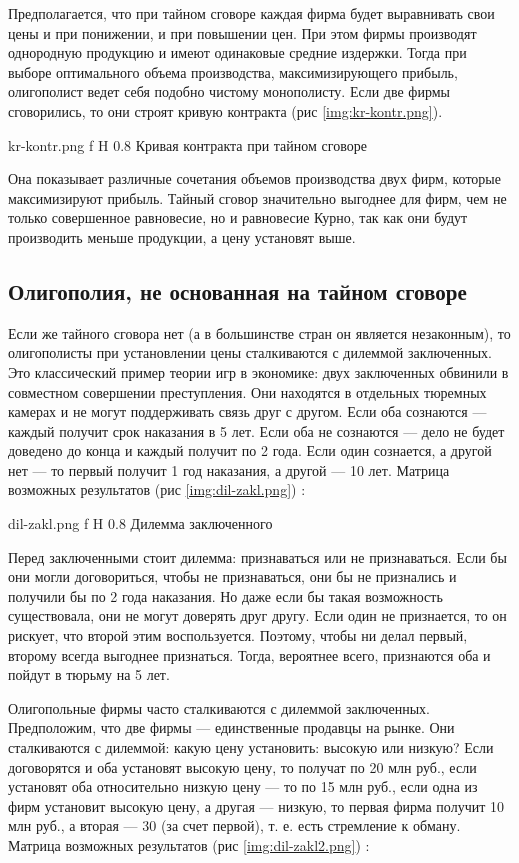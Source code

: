 Предполагается, что при тайном сговоре каждая фирма будет выравнивать свои цены и при понижении, и при повышении цен. 
При этом фирмы производят однородную продукцию и имеют одинаковые средние издержки. 
Тогда при выборе оптимального объема производства, максимизирующего прибыль, олигополист ведет себя подобно чистому монополисту. 
Если две фирмы сговорились, то они строят кривую контракта (рис \ref{img:kr-kontr.png}).

{kr-kontr.png}
{f}
{H}
{0.8\textwidth}
{Кривая контракта при тайном сговоре}

Она показывает различные сочетания объемов производства двух фирм, которые максимизируют прибыль. 
Тайный сговор значительно выгоднее для фирм, чем не только совершенное равновесие, но и равновесие Курно, так как они будут производить меньше продукции, а цену установят выше.

\subsection{Олигополия, не основанная на тайном сговоре}

Если же тайного сговора нет (а в большинстве стран он является незаконным), то олигополисты при установлении цены сталкиваются с дилеммой заключенных. 
Это классический пример теории игр в экономике: двух заключенных обвинили в
совместном совершении преступления. 
Они находятся в отдельных тюремных камерах и не могут поддерживать связь друг с другом. 
Если оба сознаются — каждый получит срок наказания в 5 лет. 
Если оба не сознаются — дело не будет доведено до конца и каждый получит по 2 года. 
Если один сознается, а другой нет — то первый получит 1 год наказания, а другой — 10 лет. Матрица возможных результатов (рис \ref{img:dil-zakl.png}) \cite{info_oly3}:

{dil-zakl.png}
{f}
{H}
{0.8\textwidth}
{Дилемма заключенного}

Перед заключенными стоит дилемма: признаваться или не признаваться. 
Если бы они могли договориться, чтобы не признаваться, они бы не признались и получили бы по 2 года наказания. 
Но даже если бы такая возможность существовала, они не могут доверять друг другу. 
Если  один не признается, то он рискует, что второй этим воспользуется. 
Поэтому, чтобы ни делал первый, второму всегда выгоднее признаться. 
Тогда, вероятнее всего, признаются оба и пойдут в тюрьму на 5 лет.

Олигопольные фирмы часто сталкиваются с дилеммой заключенных. 
Предположим, что две фирмы — единственные продавцы на рынке. 
Они сталкиваются с дилеммой: какую цену установить: высокую или низкую? 
Если договорятся и оба установят высокую цену, то получат по 20 млн руб., если установят оба относительно низкую цену — то по 15 млн руб., если одна из фирм установит высокую цену, а другая — низкую, то первая фирма получит 10 млн руб., а вторая — 30 (за счет первой), т. е. есть стремление к обману. 
Матрица возможных результатов (рис \ref{img:dil-zakl2.png}) \cite{info_oly3}:

